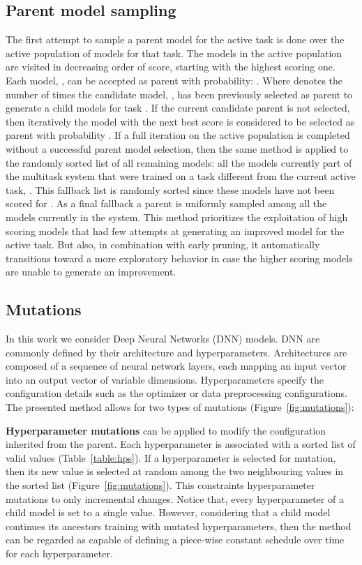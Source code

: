 \documentclass{article} \usepackage{iclr2023_conference,times}
\begin{document}
\subsection{Parent model sampling}
\label{subsection:parent-sampling}
The first attempt to sample a parent model for the active task is done over the active population of models for that task.
The models in the active population are visited in decreasing order of score, starting with the highest scoring one.
Each model, , can be accepted as parent with probability:
.
Where  denotes the number of times the candidate model, , has been previously selected as parent to generate a child models for task .
If the current candidate parent is not selected, then iteratively the model with the next best score is considered to be selected as parent with probability .
If a full iteration on the active population is completed without a successful parent model selection, then the same method is applied to the randomly sorted list of all remaining models: all the models currently part of the multitask system that were trained on a task different from the current active task, .
This fallback list is randomly sorted since these models have not been scored for .
As a final fallback a parent is uniformly sampled among all the models currently in the system.
This method prioritizes the exploitation of high scoring models that had few attempts at generating an improved model for the active task.
But also, in combination with early pruning, it automatically transitions toward a more exploratory behavior in case the higher scoring models are unable to generate an improvement.

\subsection{Mutations}
\label{subsection:mutations}
In this work we consider Deep Neural Networks (DNN) models. 
DNN are commonly defined by their architecture and hyperparameters.
Architectures are composed of a sequence of neural network layers, each mapping an input vector into an output vector of variable dimensions.
Hyperparameters specify the configuration details such as the optimizer or data preprocessing configurations.
The presented method allows for two types of mutations (Figure~\ref{fig:mutations}):

\textbf{Hyperparameter mutations} can be applied to modify the configuration inherited from the parent.
Each hyperparameter is associated with a sorted list of valid values (Table~\ref{table:hps}).
If a hyperparameter is selected for mutation, then its new value is selected at random among the two neighbouring values in the sorted list (Figure~\ref{fig:mutations}).
This constraints hyperparameter mutations to only incremental changes.
Notice that, every hyperparameter of a child model is set to a single value. However, considering that a child model continues its ancestors training with mutated hyperparameters, then the method can be regarded as capable of defining a piece-wise constant schedule over time for each hyperparameter.
\end{document}
